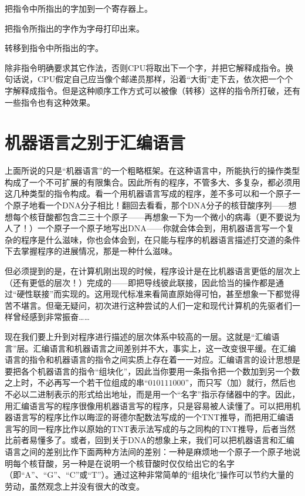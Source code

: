 \begin{description}[format=\inst,labelindent=\parindent,
  leftmargin=2\parindent,itemindent=!,labelsep=\ccwd]
\item[{ADD [加]}] 把指令中所指出的字加到一个寄存器上。


\item[{PRINT [打印]}]把指令所指出的字作为字母打印出来。


\item[{JUMP [转移]}]转移到指令中所指出的字。

\end{description}

除非指令明确要求其它作法，否则CPU将取出下一个字，并把它解释成指令。换句话说，CPU假定自己应当像个邮递员那样，沿着“大街”走下去，依次把一个个字解释成指令。但是这种顺序工作方式可以被像（转移）这样的指令所打破，还有一些指令也有这种效果。

\section{机器语言之别于汇编语言}

上面所说的只是“机器语言”的一个粗略框架。在这种语言中，所能执行的操作类型构成了一个不可扩展的有限集合。因此所有的程序，不管多大、多复杂，都必须用这几种类型的指令构成。看一个用机器语言写成的程序，差不多可以和一个原子一个原子地看一个DNA分子相比！翻回去看看，那个DNA分子的核苷酸序列——想想每个核苷酸都包含二三十个原子——再想象一下为一个微小的病毒（更不要说为人了！）一个原子一个原子地写出DNA——你就会体会到，用机器语言写一个复杂的程序是什么滋味，你也会体会到，在只能与程序的机器语言描述打交道的条件下去掌握程序的进展情况，那是一种什么滋味。

但必须提到的是，在计算机刚出现的时候，程序设计是在比机器语言更低的层次上（还有更低的层次！）完成的——即把导线彼此联接，因此恰当的操作都是通过“硬性联接”而实现的。这用现代标准来看简直原始得可怕，甚至想象一下都觉得苦不堪言。但毫无疑问，初次进行这种尝试的人们一定和现代计算机的先驱者们一样曾经感到非常振奋……

现在我们要上升到对程序进行描述的层次体系中较高的一层。这就是“汇编语言”层。汇编语言和机器语言之间差别并不大，事实上，这一改变很平缓。在汇编语言的指令和机器语言的指令之间实质上存在着一一对应。汇编语言的设计思想是要把各个机器语言的指令“组块化”，因此当你要用一条指令把一个数加到另一个数之上时，不必再写一个若干位组成的串“$010111000$”，而只写（加）就行，然后也不必以二进制表示的形式给出地址，而是用一个“名字”指示存储器中的字。因此，用汇编语言写的程序很像用机器语言写的程序，只是容易被人读懂了。可以把用机器语言写的程序比作以晦涩的哥德尔配数法写成的一个TNT推导，而把用汇编语言写的同一程序比作以原始的TNT表示法写成的与之同构的TNT推导，后者当然比前者易懂多了。或者，回到关于DNA的想象上来，我们可以把机器语言和汇编语言之间的差别比作下面两种方法间的差别：一种是麻烦地一个原子一个原子地说明每个核苷酸，另一种是在说明一个核苷酸时仅仅给出它的名字（即“A”、“G”、“C”或“T”）。通过这种非常简单的“组块化”操作可以节约大量的劳动，虽然观念上并没有很大的改变。

